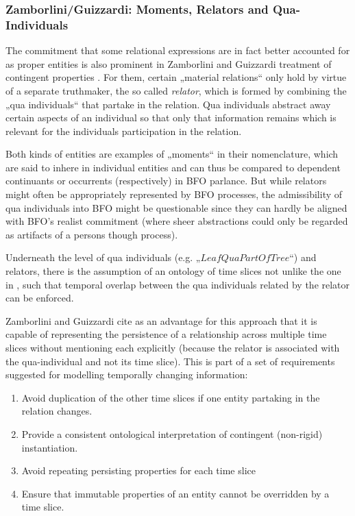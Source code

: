 \documentclass{ao2e}
\newcommand{\mclass}[1]{\ensuremath{\mathit{#1}}}
\begin{document}
\subsubsection{Zamborlini/Guizzardi: Moments, Relators and Qua-Individuals}
The commitment that some relational expressions are in fact better accounted for
as proper entities is also prominent in Zamborlini and Guizzardi treatment of 
contingent properties \cite{Zamborlini:Guizzardi}. For them, certain „material
relations“ only hold by virtue of a separate truthmaker, the so called
\emph{relator}, which is formed by combining the „qua individuals“ that
partake in the relation. Qua individuals abstract away certain aspects of an
individual so that only that information remains which is relevant for the
individuals participation in the relation. 

Both kinds of entities are examples of „moments“ in their
nomenclature, which are said to inhere in individual entities and can thus be
compared to dependent continuants or occurrents (respectively) in BFO
parlance. But while relators might often be appropriately represented by BFO
processes, the admissibility of qua individuals into BFO might be questionable
since they can hardly be aligned with BFO's realist commitment (where sheer
abstractions could only be regarded as artifacts of a persons though process). 

Underneath the level of qua individuals (e.g. „$\mclass{LeafQuaPartOfTree}$“)
and relators, there is the assumption of an ontology of time slices not unlike
the one in \cite{Welty:2006}, such that
temporal overlap between the qua individuals related by the relator can be
enforced.

Zamborlini and Guizzardi cite as an advantage for this approach that it is capable
of representing the persistence of a relationship across multiple time slices
without mentioning each explicitly (because the relator is associated with the
qua-individual and not its time slice). This is part of a set of requirements
suggested for modelling temporally changing information:

\begin{enumerate}
\item Avoid duplication of the other time slices if one entity partaking in the
relation changes.
\item Provide a consistent ontological interpretation of contingent (non-rigid)
instantiation.
\item Avoid repeating persisting properties for each time slice
\item Ensure that immutable properties of an entity cannot be overridden by a
time slice.
\end{enumerate}
\end{document}
